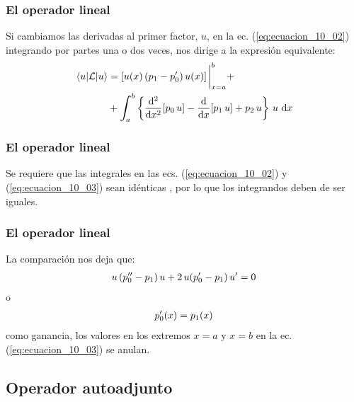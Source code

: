 \documentclass[12pt]{beamer}
\begin{document}
\begin{frame}
\frametitle{El operador lineal}
Si cambiamos las derivadas al primer factor, $u$, en la ec. (\ref{eq:ecuacion_10_02}) integrando por partes una o dos veces, nos dirige a la expresión equivalente:
\pause
\begin{align}
\begin{aligned}
\matrixel{u}{\mathcal{L}}{u} &= [ u(x) \, ( p_{1} - \pderivada{p}_{0} ) \, u(x)] \eval_{x=a}^{b} + \\
&+ \scaleint{6ex}_{\bs a}^{b} \left\{ \dv[2]{x} [p_{0} \, u] - \dv{x} [p_{1} \, u] + p_{2} \, u \right\} \, u \, \dd{x}
\end{aligned}
\label{eq:ecuacion_10_03}
\end{align}
\end{frame}
\begin{frame}
\frametitle{El operador lineal}
Se requiere que las integrales en las ecs. (\ref{eq:ecuacion_10_02}) y (\ref{eq:ecuacion_10_03}) sean idénticas , por lo que los integrandos deben de ser iguales.
\end{frame}
\begin{frame}
\frametitle{El operador lineal}
La comparación nos deja que:
\pause
\begin{align*}
u \, ({p}^{\prime \prime}_{0} - p_{1}) \, u + 2 \, u ({p}^{\prime}_{0} - p_{1}) \, {u}^{\prime} = 0
\end{align*}
\pause
o
\begin{align}
{p}^{\prime}_{0} (x) = p_{1} (x)
\label{eq:ecuacion_10_04}
\end{align}
como ganancia, los valores en los extremos $x = a$ y $x = b$ en la ec. (\ref{eq:ecuacion_10_03}) se anulan.
\end{frame}

\subsection{Operador autoadjunto}
\end{document}
